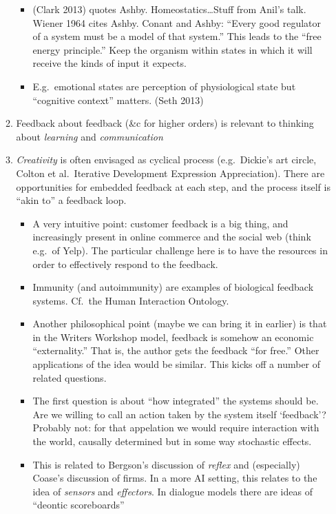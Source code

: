 \begin{enumerate}[start=4]
\begin{enumerate}
\begin{itemize}
\item (Clark 2013) quotes Ashby.  Homeostatics\ldots Stuff from Anil's talk.
  Wiener 1964 cites Ashby.  Conant and Ashby: ``Every good regulator
  of a system must be a model of that system.''  This leads to the
  ``free energy principle.''  Keep the organism within states in which
  it will receive the kinds of input it expects.
\item E.g.~emotional states are perception of physiological state but ``cognitive context'' matters.  (Seth 2013)
\end{itemize}
\item Feedback about feedback (\&c for higher orders) is relevant to thinking about \emph{learning} and \emph{communication}
\item \emph{Creativity} is often envisaged as cyclical process (e.g.~Dickie's
  art circle, Colton et al.~Iterative
  Development Expression Appreciation).  There are opportunities for
  embedded feedback at each step, and the process itself is ``akin
  to'' a feedback loop.
\begin{itemize}
\item A very intuitive point: customer feedback is a big thing, and increasingly present in online commerce and the social web (think e.g.~of Yelp).  The particular challenge here is to have the resources in order to effectively respond to the feedback.
\item Immunity (and autoimmunity) are examples of biological feedback systems.  Cf.~the Human Interaction Ontology.
\item Another philosophical point (maybe we can bring it in earlier)
  is that in the Writers Workshop model, feedback is somehow an
  economic ``externality.''  That is, the author gets the feedback
  ``for free.''  Other applications of the idea would be similar.
  This kicks off a number of related questions.
\item The first question is about ``how integrated'' the systems
  should be.  Are we willing to call an action taken by the system
  itself `feedback'?  Probably not: for that appelation we would
  require interaction with the world, causally determined but in some
  way stochastic effects.
\item This is related to Bergson's discussion of \emph{reflex} and
  (especially) Coase's discussion of firms.  In a more AI setting,
  this relates to the idea of \emph{sensors} and \emph{effectors}.  In
  dialogue models there are ideas of ``deontic scoreboards''

\end{itemize}
\end{enumerate}
\end{enumerate}
